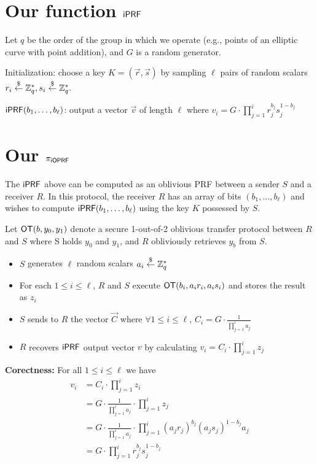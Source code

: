 \documentclass{article}
\begin{document}
\section{Our function $\mathsf{i}\mathsf{PRF}$}
Let $q$ be the order of the group in which we operate (e.g., points of
an elliptic curve with point addition), and $G$ is a random generator.

Initialization: choose a key $K=(\vec{{r}},\vec{s})$ by sampling $\ell$ pairs of random scalars ${r_{i}}\stackrel{\$}{\leftarrow}\mathbb{Z}^*_q,{s_{i}}\stackrel{\$}{\leftarrow}\mathbb{Z}^*_q.$

$\mathsf{i}\mathsf{PRF}(b_1,\ldots,b_\ell)$: output a vector $\vec{v}$ of length $\ell$ where $v_i = G \cdot \prod_{j=1}^{i} r_j^{b_j}s_j^{1-b_j}$


\section{Our ${\pi_{\mathsf{i}\mathsf{OPRF}}}$}

The $\mathsf{i}\mathsf{PRF}$ above can be computed as an oblivious PRF between a sender $S$ and a receiver $R$.  In this protocol,
the receiver $R$ has an array of bits $(b_1, \ldots, b_\ell)$ and wishes to compute $\mathsf{i}\mathsf{PRF}(b_1, \ldots, b_\ell)$ using
the key $K$ possessed by $S$.

Let $\mathsf{OT}(b, y_0, y_1)$ denote a secure 1-out-of-2 oblivious transfer protocol between $R$ and $S$ where
S holds $y_0$ and $y_1$, and $R$ obliviously retrieves $y_b$ from $S$.  

\begin{itemize}
\item $S$ generates $\ell$ random scalars $a_i\stackrel{\$}{\leftarrow}\mathbb{Z}^*_q$
\item For each $1 \leq i \leq \ell$, $R$ and $S$ execute $\mathsf{OT}(b_i, a_ir_i, a_is_i)$ and stores the result as $z_i$
\item $S$ sends to $R$ the vector $\vec{C}$ where $\forall 1 \leq i \leq \ell$, $C_i =  G \cdot \frac{1}{\prod_{j=1}^{i} a_j}$
\item $R$ recovers $\mathsf{i}\mathsf{PRF}$ output vector $v$ by calculating $v_i = C_i \cdot \prod_{j=1}^{i} z_j$
\end{itemize}

{\bf Corectness:} For all $1 \leq i \leq \ell$ we have
\begin{equation}
\begin{aligned}
v_i &= C_i \cdot \prod_{j=1}^{i} z_i \\
&= G \cdot \frac{1}{\prod_{j=1}^{i} a_j} \cdot \prod_{j=1}^{i} z_j \\
&= G \cdot \frac{1}{\prod_{j=1}^{i} a_j} \cdot \prod_{j=1}^{i} (a_jr_j)^{b_j}(a_js_j)^{1-b_j} a_j \\
&= G \cdot \prod_{j=1}^{i} r_j^{b_j}s_j^{1-b_j}
\end{aligned}
\end{equation}
\end{document}
